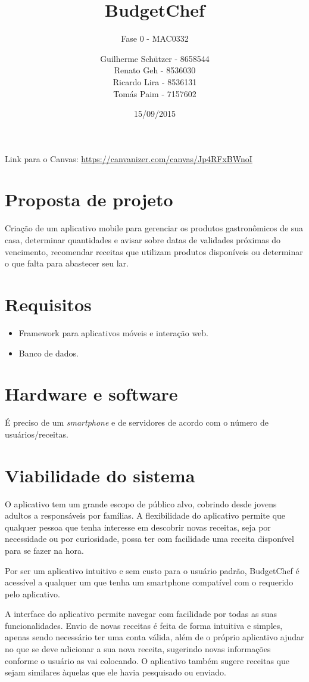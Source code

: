 \documentclass[a4paper]{article}
\title{BudgetChef}
\subtitle{Fase 0 - MAC0332}
\author{
	Guilherme Schützer - 8658544\\
	Renato Geh - 8536030\\
	Ricardo Lira - 8536131\\
	Tomás Paim - 7157602\\
}
\date{15/09/2015}
\begin{document}
\maketitle

Link para o Canvas: \url{https://canvanizer.com/canvas/Jp4RFxBWnoI}

\section{Proposta de projeto}

Criação de um aplicativo mobile para gerenciar os produtos gastronômicos de sua casa, determinar quantidades e avisar sobre datas de validades próximas do vencimento, recomendar receitas que utilizam produtos disponíveis ou determinar o que falta para abastecer seu lar.

\section{Requisitos}

\begin{itemize}

\item Framework para aplicativos móveis e interação web.
\item Banco de dados.

\end{itemize}

\section{Hardware e software}

É preciso de um \emph{smartphone} e de servidores de acordo com o número de usuários/receitas.

\section{Viabilidade do sistema}

O aplicativo tem um grande escopo de público alvo, cobrindo desde jovens adultos a responsáveis por famílias. A flexibilidade do aplicativo permite que qualquer pessoa que tenha interesse em descobrir novas receitas, seja por necessidade ou por curiosidade, possa ter com facilidade uma receita disponível para se fazer na hora.

\par Por ser um aplicativo intuitivo e sem custo para o usuário padrão, BudgetChef é acessível a qualquer um que tenha um smartphone compatível com o requerido pelo aplicativo.

\par A interface do aplicativo permite navegar com facilidade por todas as suas funcionalidades. Envio de novas receitas é feita de forma intuitiva e simples, apenas sendo necessário ter uma conta válida, além de o próprio aplicativo ajudar no que se deve adicionar a sua nova receita, sugerindo novas informações conforme o usuário as vai colocando. O aplicativo também sugere receitas que sejam similares àquelas que ele havia pesquisado ou enviado.
\end{document}

